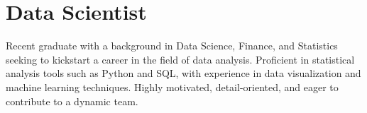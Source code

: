 
\section{Data Scientist}
\small{
    Recent graduate with a background in Data Science, Finance, and Statistics seeking to kickstart a career in the field of data analysis. Proficient in statistical analysis tools such as Python and SQL, with experience in data visualization and machine learning techniques. Highly motivated, detail-oriented, and eager to contribute to a dynamic team.
}